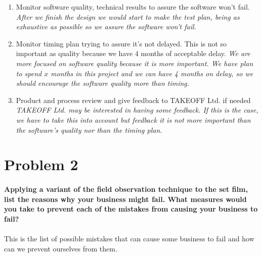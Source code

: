 \documentclass{article}
\begin{document}
\begin{enumerate}
\item Monitor software quality, technical results to assure the software won't fail. \textit{After we finish the design we would start to make the test plan, being as exhaustive as possible so we assure the software won't fail.}

\item Monitor timing plan trying to assure it's not delayed. This is not so important as quality because we have 4 months of acceptable delay. \textit{We are more focused on software quality because it is more important. We have plan to spend $x$ months in this project and we can have 4 months on delay, so we should encourage the software quality more than timing.}


\item Product and process review and give feedback to TAKEOFF Ltd. if needed \textit{TAKEOFF Ltd. may be interested in having some feedback. If this is the case, we have to take this into account but feedback it is not more important than the software's quality nor than the timing plan.}

\end{enumerate}

\newpage
\section{Problem 2}

\paragraph{Applying a variant of the field observation technique to the set film, list the reasons why your business might fail. What measures would you take to prevent each of the mistakes from causing your business to fail?}
\paragraph{}

This is the list of possible mistakes that can cause some business to fail and how can we prevent ourselves from them.
\end{document}
